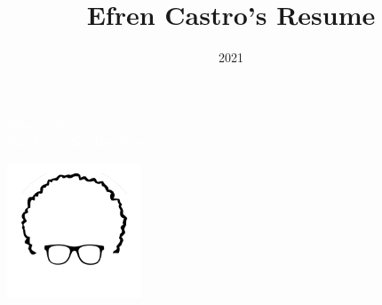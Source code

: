 \documentclass[11pt,oneside,a4paper,titlepage]{article}
\title{Efren Castro's Resume}
\date{2021}
\begin{document}

\begin{tcolorbox}
  \begin{minipage}{15cm}
    \huge{\textcolor{white}{Efren Castro}}\\
    \large{\textcolor{white}{Full Stack Web Developer}}
  \end{minipage}
  \begin{minipage}{4.5cm}
    \includegraphics[width=4cm,trim=-3cm 5cm 3cm 0]{Logo.png}
  \end{minipage}
\end{tcolorbox}
\end{document}
